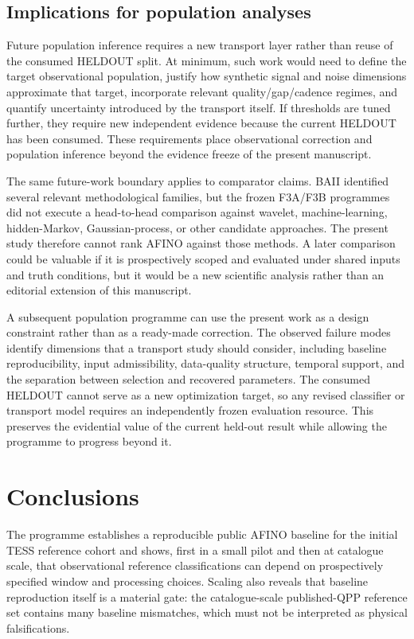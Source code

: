 \documentclass[11pt,a4paper]{article}
\begin{document}
\subsection{Implications for population analyses}
Future population inference requires a new transport layer rather than reuse of the consumed HELDOUT split. At minimum, such work would need to define the target observational population, justify how synthetic signal and noise dimensions approximate that target, incorporate relevant quality/gap/cadence regimes, and quantify uncertainty introduced by the transport itself. If thresholds are tuned further, they require new independent evidence because the current HELDOUT has been consumed. These requirements place observational correction and population inference beyond the evidence freeze of the present manuscript.

The same future-work boundary applies to comparator claims. BAII identified several relevant methodological families, but the frozen F3A/F3B programmes did not execute a head-to-head comparison against wavelet, machine-learning, hidden-Markov, Gaussian-process, or other candidate approaches. The present study therefore cannot rank AFINO against those methods. A later comparison could be valuable if it is prospectively scoped and evaluated under shared inputs and truth conditions, but it would be a new scientific analysis rather than an editorial extension of this manuscript.

A subsequent population programme can use the present work as a design constraint rather than as a ready-made correction. The observed failure modes identify dimensions that a transport study should consider, including baseline reproducibility, input admissibility, data-quality structure, temporal support, and the separation between selection and recovered parameters. The consumed HELDOUT cannot serve as a new optimization target, so any revised classifier or transport model requires an independently frozen evaluation resource. This preserves the evidential value of the current held-out result while allowing the programme to progress beyond it.

\section{Conclusions}
The programme establishes a reproducible public AFINO baseline for the initial TESS reference cohort and shows, first in a small pilot and then at catalogue scale, that observational reference classifications can depend on prospectively specified window and processing choices. Scaling also reveals that baseline reproduction itself is a material gate: the catalogue-scale published-QPP reference set contains many baseline mismatches, which must not be interpreted as physical falsifications.
\end{document}
